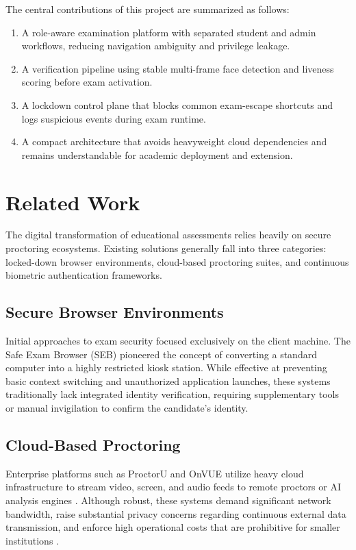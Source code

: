 \documentclass[conference]{IEEEtran}
\begin{document}
The central contributions of this project are summarized as follows:
\begin{enumerate}
\item A role-aware examination platform with separated student and admin workflows, reducing navigation ambiguity and privilege leakage.
\item A verification pipeline using stable multi-frame face detection and liveness scoring before exam activation.
\item A lockdown control plane that blocks common exam-escape shortcuts and logs suspicious events during exam runtime.
\item A compact architecture that avoids heavyweight cloud dependencies and remains understandable for academic deployment and extension.
\end{enumerate}

\section{Related Work}
The digital transformation of educational assessments relies heavily on secure proctoring ecosystems. Existing solutions generally fall into three categories: locked-down browser environments, cloud-based proctoring suites, and continuous biometric authentication frameworks.

\subsection{Secure Browser Environments}
Initial approaches to exam security focused exclusively on the client machine. The Safe Exam Browser (SEB) \cite{ethseb} pioneered the concept of converting a standard computer into a highly restricted kiosk station. While effective at preventing basic context switching and unauthorized application launches, these systems traditionally lack integrated identity verification, requiring supplementary tools or manual invigilation to confirm the candidate's identity.

\subsection{Cloud-Based Proctoring}
Enterprise platforms such as ProctorU and OnVUE utilize heavy cloud infrastructure to stream video, screen, and audio feeds to remote proctors or AI analysis engines \cite{proctoring}. Although robust, these systems demand significant network bandwidth, raise substantial privacy concerns regarding continuous external data transmission, and enforce high operational costs that are prohibitive for smaller institutions \cite{hossain_2025_zerotrust}.
\end{document}
